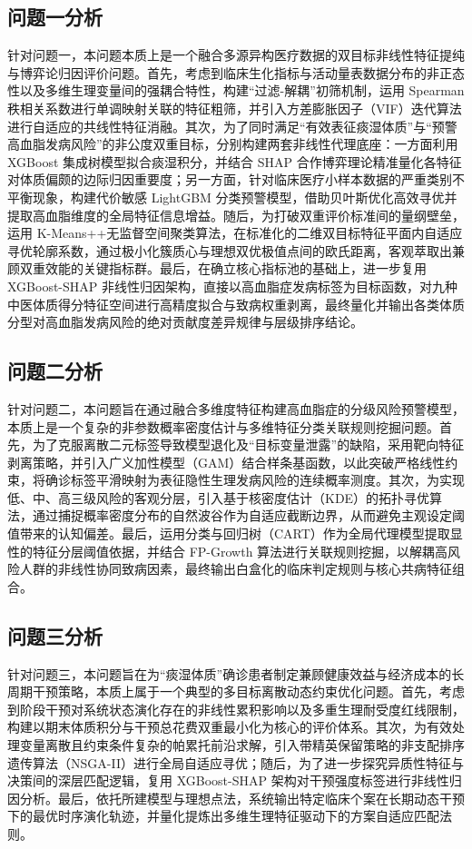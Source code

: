 \documentclass[12pt]{article}
\begin{document}
	\subsection{问题一分析}
	{\songti{}
		针对问题一，本问题本质上是一个融合多源异构医疗数据的双目标非线性特征提纯与博弈论归因评价问题。首先，考虑到临床生化指标与活动量表数据分布的非正态性以及多维生理变量间的强耦合特性，构建“过滤-解耦”初筛机制，运用 Spearman 秩相关系数进行单调映射关联的特征粗筛，并引入方差膨胀因子（VIF）迭代算法进行自适应的共线性特征消融。其次，为了同时满足“有效表征痰湿体质”与“预警高血脂发病风险”的非公度双重目标，分别构建两套非线性代理底座：一方面利用 XGBoost 集成树模型拟合痰湿积分，并结合 SHAP 合作博弈理论精准量化各特征对体质偏颇的边际归因重要度；另一方面，针对临床医疗小样本数据的严重类别不平衡现象，构建代价敏感 LightGBM 分类预警模型，借助贝叶斯优化高效寻优并提取高血脂维度的全局特征信息增益。随后，为打破双重评价标准间的量纲壁垒，运用 K-Means++无监督空间聚类算法，在标准化的二维双目标特征平面内自适应寻优轮廓系数，通过极小化簇质心与理想双优极值点间的欧氏距离，客观萃取出兼顾双重效能的关键指标群。最后，在确立核心指标池的基础上，进一步复用 XGBoost-SHAP 非线性归因架构，直接以高血脂症发病标签为目标函数，对九种中医体质得分特征空间进行高精度拟合与致病权重剥离，最终量化并输出各类体质分型对高血脂发病风险的绝对贡献度差异规律与层级排序结论。\par}
		
		\subsection{问题二分析}
		{\songti{}
		针对问题二，本问题旨在通过融合多维度特征构建高血脂症的分级风险预警模型，本质上是一个复杂的非参数概率密度估计与多维特征分类关联规则挖掘问题。首先，为了克服离散二元标签导致模型退化及“目标变量泄露”的缺陷，采用靶向特征剥离策略，并引入广义加性模型（GAM）结合样条基函数，以此突破严格线性约束，将确诊标签平滑映射为表征隐性生理发病风险的连续概率测度。其次，为实现低、中、高三级风险的客观分层，引入基于核密度估计（KDE）的拓扑寻优算法，通过捕捉概率密度分布的自然波谷作为自适应截断边界，从而避免主观设定阈值带来的认知偏差。最后，运用分类与回归树（CART）作为全局代理模型提取显性的特征分层阈值依据，并结合 FP-Growth 算法进行关联规则挖掘，以解耦高风险人群的非线性协同致病因素，最终输出白盒化的临床判定规则与核心共病特征组合。\par}
		
		\subsection{问题三分析}
		{\songti{}
		针对问题三，本问题旨在为“痰湿体质”确诊患者制定兼顾健康效益与经济成本的长周期干预策略，本质上属于一个典型的多目标离散动态约束优化问题。首先，考虑到阶段干预对系统状态演化存在的非线性累积影响以及多重生理耐受度红线限制，构建以期末体质积分与干预总花费双重最小化为核心的评价体系。其次，为有效处理变量离散且约束条件复杂的帕累托前沿求解，引入带精英保留策略的非支配排序遗传算法（NSGA-II）进行全局自适应寻优；随后，为了进一步探究异质性特征与决策间的深层匹配逻辑，复用 XGBoost-SHAP 架构对干预强度标签进行非线性归因分析。最后，依托所建模型与理想点法，系统输出特定临床个案在长期动态干预下的最优时序演化轨迹，并量化提炼出多维生理特征驱动下的方案自适应匹配法则。\par}
		
\end{document}
